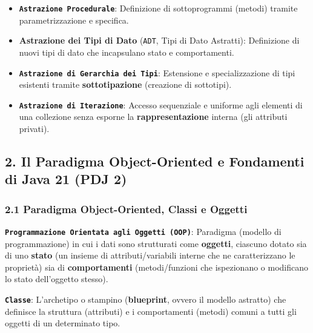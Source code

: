 \begin{itemize}

\item \textbf{\texttt{Astrazione Procedurale}}: Definizione di sottoprogrammi (metodi) tramite parametrizzazione e specifica.



\item \textbf{Astrazione dei Tipi di Dato} (\texttt{ADT}, Tipi di Dato Astratti): Definizione di nuovi tipi di dato che incapsulano stato e comportamenti.



\item \textbf{\texttt{Astrazione di Gerarchia dei Tipi}}: Estensione e specializzazione di tipi esistenti tramite \textbf{sottotipazione} (creazione di sottotipi).



\item \textbf{\texttt{Astrazione di Iterazione}}: Accesso sequenziale e uniforme agli elementi di una collezione senza esporne la \textbf{rappresentazione} interna (gli attributi privati).

\end{itemize}

\subsection{2. Il Paradigma Object-Oriented e Fondamenti di Java 21 (PDJ 2)}\label{2-il-paradigma-object-oriented-e-fondamenti-di-java-21-pdj-2}

\subsubsection{2.1 Paradigma Object-Oriented, Classi e Oggetti}\label{2-1-paradigma-object-oriented-classi-e-oggetti}

\textbf{\texttt{Programmazione Orientata agli Oggetti (OOP)}}: Paradigma (modello di programmazione) in cui i dati sono strutturati come \textbf{oggetti}, ciascuno dotato sia di uno \textbf{stato} (un insieme di attributi/variabili interne che ne caratterizzano le proprietà) sia di \textbf{comportamenti} (metodi/funzioni che ispezionano o modificano lo stato dell'oggetto stesso).

\textbf{\texttt{Classe}}: L'archetipo o stampino (\textbf{blueprint}, ovvero il modello astratto) che definisce la struttura (attributi) e i comportamenti (metodi) comuni a tutti gli oggetti di un determinato tipo.

